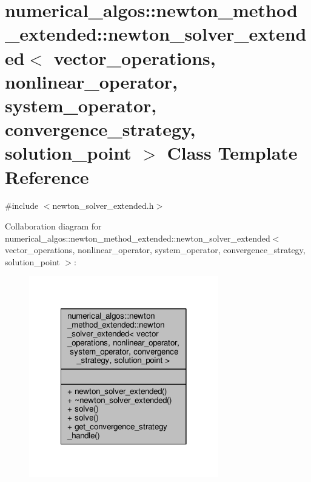 \hypertarget{classnumerical__algos_1_1newton__method__extended_1_1newton__solver__extended}{\section{numerical\-\_\-algos\-:\-:newton\-\_\-method\-\_\-extended\-:\-:newton\-\_\-solver\-\_\-extended$<$ vector\-\_\-operations, nonlinear\-\_\-operator, system\-\_\-operator, convergence\-\_\-strategy, solution\-\_\-point $>$ Class Template Reference}
\label{classnumerical__algos_1_1newton__method__extended_1_1newton__solver__extended}
}


{\ttfamily \#include $<$newton\-\_\-solver\-\_\-extended.\-h$>$}



Collaboration diagram for numerical\-\_\-algos\-:\-:newton\-\_\-method\-\_\-extended\-:\-:newton\-\_\-solver\-\_\-extended$<$ vector\-\_\-operations, nonlinear\-\_\-operator, system\-\_\-operator, convergence\-\_\-strategy, solution\-\_\-point $>$\-:\nopagebreak
\begin{figure}[H]
\begin{center}
\leavevmode
\includegraphics[width=234pt]{classnumerical__algos_1_1newton__method__extended_1_1newton__solver__extended__coll__graph}
\end{center}
\end{figure}
